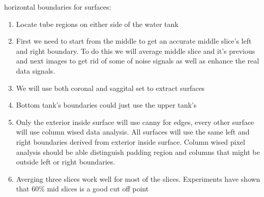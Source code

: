 horizontal boundaries for surfaces:
\begin{enumerate}
\item Locate tube regions on either side of the water tank
\item First we need to start from the middle to get an accurate middle slice's left and right boundary. To
  do this we will average middle slice and it's previous and next images to get rid of some of noise signals 
  as well as enhance the real data signals. 
\item We will use both coronal and saggital set to extract surfaces
\item Bottom tank's boundaries could just use the upper tank's
\item Only the exterior inside surface will use canny for edges, every other surface will use column wised
  data analysis. 
  All surfaces will use the same left and right boundaries derived from exterior inside surface.
  Column wised pixel analysis should be able distinguish padding region and columns that might be outside
  left or right boundaries.
\item Averging three slices work well for most of the slices. Experiments have shown that 60\% mid slices 
  is a good cut off point
\end{enumerate}